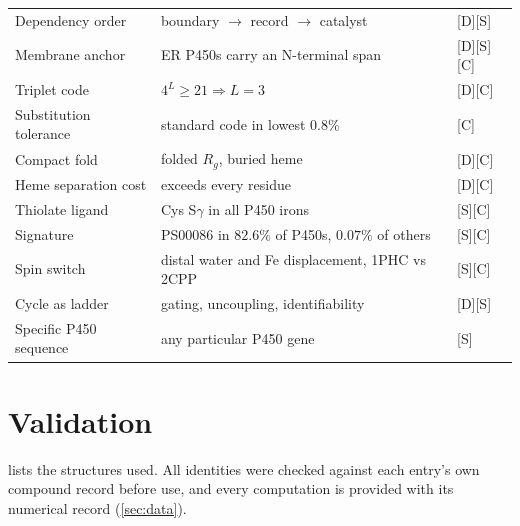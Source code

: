\documentclass[10pt,twocolumn,a4paper]{article}
\newcommand{\D}{\textsf{[D]}}
\newcommand{\Sup}{\textsf{[S]}}
\newcommand{\C}{\textsf{[C]}}
\begin{document}
\begin{table}[t]
\begin{tabular}{@{}p{4.3cm}p{6.3cm}p{2.8cm}@{}}
Dependency order & boundary $\to$ record $\to$ catalyst & \D\Sup\\
Membrane anchor & ER P450s carry an N-terminal span & \D\Sup\C\\
Triplet code & $4^L\ge21\Rightarrow L=3$ & \D\C\\
Substitution tolerance & standard code in lowest $0.8\%$ & \C\\
Compact fold & folded $R_g$, buried heme & \D\C\\
Heme separation cost & exceeds every residue & \D\C\\
Thiolate ligand & Cys S$\gamma$ in all P450 irons & \Sup\C\\
Signature & PS00086 in $82.6\%$ of P450s, $0.07\%$ of others & \Sup\C\\
Spin switch & distal water and Fe displacement, 1PHC vs 2CPP & \Sup\C\\
Cycle as ladder & gating, uncoupling, identifiability & \D\Sup\\
Specific P450 sequence & any particular P450 gene & \Sup\\
\bottomrule
\end{tabular}
\end{table}

\section{Validation}
\label{sec:validation}

 lists the structures used. All identities were checked
against each entry's own compound record before use, and every computation
is provided with its numerical record (\cref{sec:data}).
\end{document}
